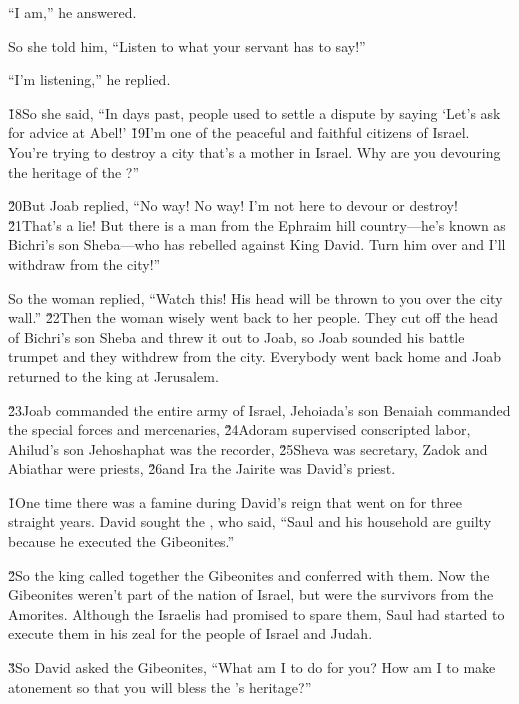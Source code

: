 ``I am,'' he answered.

So she told him, ``Listen to what your servant has to say!''

``I'm listening,'' he replied.

\v{18}So she said, ``In days past, people used to settle a dispute by saying `Let's ask for advice at Abel!' \v{19}I'm one of the peaceful and faithful citizens of Israel. You're trying to destroy a city that's a mother in Israel. Why are you devouring the heritage of the ?''

\v{20}But Joab replied, ``No way! No way! I'm not here to devour or destroy! \v{21}That's a lie! But there is a man from the Ephraim hill country---he's known as Bichri's son Sheba---who has rebelled against King David. Turn him over and I'll withdraw from the city!''

So the woman replied, ``Watch this! His head will be thrown to you over the city wall.'' \v{22}Then the woman wisely went back to her people. They cut off the head of Bichri's son Sheba and threw it out to Joab, so Joab sounded his battle trumpet and they withdrew from the city. Everybody went back home and Joab returned to the king at Jerusalem.

\v{23}Joab commanded the entire army of Israel, Jehoiada's son Benaiah commanded the special forces and mercenaries, \v{24}Adoram supervised conscripted labor, Ahilud's son Jehoshaphat was the recorder, \v{25}Sheva was secretary, Zadok and Abiathar were priests, \v{26}and Ira the Jairite was David's priest.

\v{1}One time there was a famine during David's reign that went on for three straight years. David sought the , who said, ``Saul and his household are guilty because he executed the Gibeonites.''

\v{2}So the king called together the Gibeonites and conferred with them. Now the Gibeonites weren't part of the nation of Israel, but were the survivors from the Amorites. Although the Israelis had promised to spare them, Saul had started to execute them in his zeal for the people of Israel and Judah.

\v{3}So David asked the Gibeonites, ``What am I to do for you? How am I to make atonement so that you will bless the 's heritage?''

